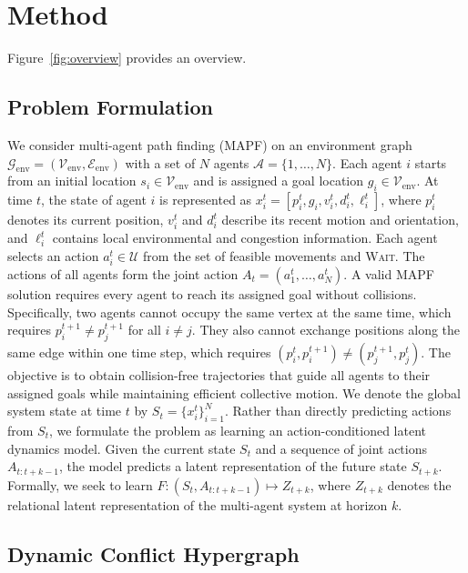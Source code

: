 \documentclass{article} %
\begin{document}

\section{Method}
\label{sec:method}

 
Figure~\ref{fig:overview} provides an overview.

\subsection{Problem Formulation} \label{sec:problem} 
We consider multi-agent path finding (MAPF) on an environment graph $\mathcal{G}_{\mathrm{env}}=(\mathcal{V}_{\mathrm{env}},\mathcal{E}_{\mathrm{env}})$ with a set of $N$ agents $\mathcal{A}=\{1,\ldots,N\}$. Each agent $i$ starts from an initial location $s_i\in\mathcal{V}_{\mathrm{env}}$ and is assigned a goal location $g_i\in\mathcal{V}_{\mathrm{env}}$. At time $t$, the state of agent $i$ is represented as $x_i^t=[p_i^t,g_i,v_i^t,d_i^t,\ell_i^t]$, where $p_i^t$ denotes its current position, $v_i^t$ and $d_i^t$ describe its recent motion and orientation, and $\ell_i^t$ contains local environmental and congestion information. Each agent selects an action $a_i^t\in\mathcal{U}$ from the set of feasible movements and \textsc{Wait}. The actions of all agents form the joint action $A_t=(a_1^t,\ldots,a_N^t)$. A valid MAPF solution requires every agent to reach its assigned goal without collisions. Specifically, two agents cannot occupy the same vertex at the same time, which requires $p_i^{t+1}\neq p_j^{t+1}$ for all $i\neq j$. They also cannot exchange positions along the same edge within one time step, which requires $(p_i^t,p_i^{t+1})\neq(p_j^{t+1},p_j^t)$. The objective is to obtain collision-free trajectories that guide all agents to their assigned goals while maintaining efficient collective motion. We denote the global system state at time $t$ by $S_t=\{x_i^t\}_{i=1}^{N}$. Rather than directly predicting actions from $S_t$, we formulate the problem as learning an action-conditioned latent dynamics model. Given the current state $S_t$ and a sequence of joint actions $A_{t:t+k-1}$, the model predicts a latent representation of the future state $S_{t+k}$. Formally, we seek to learn $F:(S_t,A_{t:t+k-1})\mapsto Z_{t+k}$, where $Z_{t+k}$ denotes the relational latent representation of the multi-agent system at horizon $k$.


\subsection{Dynamic Conflict Hypergraph}
\label{sec:hypergraph}
\end{document}

